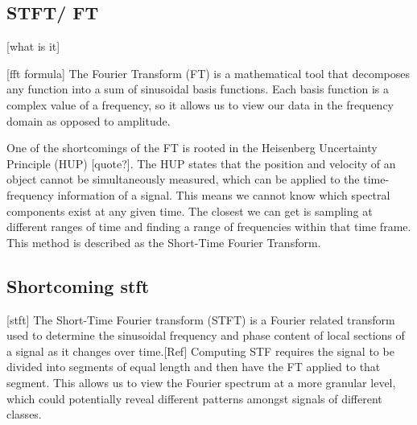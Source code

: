 \documentclass{turabian-thesis}
\begin{document}
\subsection{STFT/ FT}

[what is it]

[fft formula]
The Fourier Transform (FT) is a mathematical tool that decomposes any function into a sum of sinusoidal basis functions. Each basis function is a complex value of a frequency, so it allows us to view our data in the frequency domain as opposed to amplitude.

One of the shortcomings of the FT is rooted in the Heisenberg Uncertainty Principle (HUP) [quote?]. The HUP states that the position and velocity of an object cannot be simultaneously measured, which can be applied to the time-frequency information of a signal. This means we cannot know which spectral components exist at any given time. The closest we can get is sampling at different ranges of time and finding a range of frequencies within that time frame. This method is described as the Short-Time Fourier Transform.






\subsection{Shortcoming stft}
[stft]
The Short-Time Fourier transform (STFT) is a Fourier related transform used to determine the sinusoidal frequency and phase content of local sections of a signal as it changes over time.[Ref] 
Computing STF requires the signal to be divided into segments of equal length and then have the FT applied to that segment. This allows us to view the Fourier spectrum at a more granular level, which could potentially reveal different patterns amongst signals of different classes.
\end{document}
